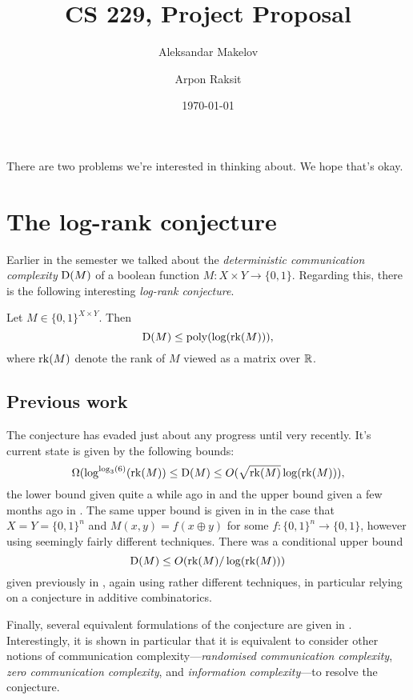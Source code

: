 


\title{CS 229, Project Proposal}
\author{Aleksandar Makelov \and Arpon Raksit}
\date{\today}


\maketitle
\thispagestyle{fancy}


There are two problems we're interested in thinking about. We hope
that's okay.

\section{The log-rank conjecture}

Earlier in the semester we talked about the \textit{deterministic
  communication complexity} $\mathrm{D}(M)$ of a boolean function $M : X
\times Y \to \{0,1\}$. Regarding this, there is the following
interesting \textit{log-rank conjecture}.

\begin{conjecture}
  Let $M \in \{0,1\}^{X \times Y}$. Then
  \[
  \mathrm{D}(M) \le \operatorname{poly}(\log(\operatorname{rk}(M))),
  \]
  where $\operatorname{rk}(M)$ denote the rank of $M$ viewed as a matrix over $\mathbb{R}$.
\end{conjecture}

\subsection{Previous work}

The conjecture has evaded just about any progress until very
recently. It's current state is given by the following bounds:
\[
\Omega(\log^{\log_3(6)}(\operatorname{rk}(M)) \le \mathrm{D}(M) \le
O(\sqrt{\operatorname{rk}(M)}\log(\operatorname{rk}(M))),
\]
the lower bound given quite a while ago in \cite{nisan-1995} and the
upper bound given a few months ago in \cite{lovett-2013}. The same
upper bound is given in \cite{tsang-2013} in the case that $X = Y =
\{0,1\}^n$ and $M(x,y) = f(x \oplus y)$ for some $f : \{0,1\}^n \to
\{0,1\}$, however using seemingly fairly different techniques. There
was a conditional upper bound
\[
\mathrm{D}(M) \le O(\operatorname{rk}(M) / \log(\operatorname{rk}(M)))
\]
given previously in \cite{ben-sasson-2012}, again using rather
different techniques, in particular relying on a conjecture in
additive combinatorics.

Finally, several equivalent formulations of the conjecture are given
in \cite{gavinsky-2013}. Interestingly, it is shown in particular that
it is equivalent to consider other notions of communication
complexity---\textit{randomised communication complexity},
\textit{zero communication complexity}, and \textit{information
  complexity}---to resolve the conjecture.

